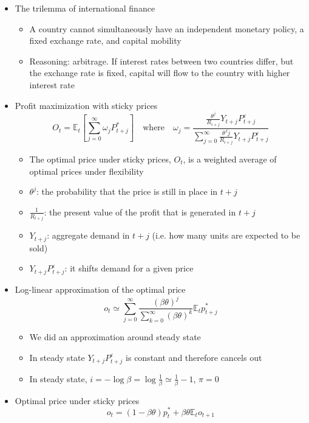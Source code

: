 \documentclass[a4paper]{article}
\begin{document}
\begin{itemize}
    \item The trilemma of international finance
    \begin{itemize}
        \item A country cannot simultaneously have an independent monetary policy, a fixed exchange rate, and capital mobility
        \item Reasoning: arbitrage. If interest rates between two countries differ, but the exchange rate is fixed, capital will flow to the country with higher interest rate
    \end{itemize}
    \item Profit maximization with sticky prices
    \[O_t=\mathbb{E}_t\left[\sum_{j=0}^{\infty}\omega_j P_{t+j}^* \right]\quad \textrm{where}\quad 
    \omega_j=\frac{\frac{\theta^j}{R_{i+j}}Y_{t+j}P_{t+j}^{\varepsilon}}{\sum_{j=0}^{\infty}\frac{\theta^Jj}{R_{i+j}}Y_{t+j}P_{t+j}^{\varepsilon}} \]
    \begin{itemize}
        \item The optimal price under sticky prices, $O_t$, is a weighted average of optimal prices under flexibility
        \item $\theta^j$: the probability that the price is still in place in $t+j$
        \item $\frac{1}{R_{t+j}}$: the present value of the profit that is generated in $t+j$
        \item $Y_{t+j}$: aggregate demand in $t+j$ (i.e. how many units are expected to be sold)
        \item $Y_{t+j}P_{t+j}^{\varepsilon}$: it shifts demand for a given price
    \end{itemize}
    \item Log-linear approximation of the optimal price
    \[o_t\simeq\sum_{j=0}^{\infty}\frac{(\beta\theta)^j}{\sum_{k=0}^{\infty}(\beta\theta)^k}\mathbb{E}_tp_{t+j}^* \]
    \begin{itemize}
        \item We did an approximation around steady state
        \item In steady state $Y_{t+j}P_{t+j}^{\varepsilon}$ is constant and therefore cancels out
        \item In steady state, $i=-\log\beta=\log\frac{1}{\beta}\simeq\frac{1}{\beta}-1$, $\pi=0$
    \end{itemize}
    \item Optimal price under sticky prices
    \[o_t=(1-\beta\theta)p_t^*+\beta\theta\mathbb{E}_to_{t+1} \]
    \begin{itemize}

\end{itemize}
\end{itemize}
\end{document}
